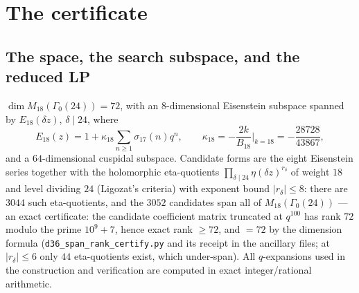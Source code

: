 \documentclass[11pt]{article}
\theoremstyle{remark}
\begin{document}
\section{The certificate}\label{sec:construction}

\subsection{The space, the search subspace, and the reduced LP}
\label{sec:space}

$\dim M_{18}(\Gamma_0(24))=72$, with an $8$-dimensional Eisenstein
subspace spanned by $E_{18}(\delta z)$, $\delta\mid 24$, where
\[
E_{18}(z)=1+\kappa_{18}\sum_{n\ge1}\sigma_{17}(n)q^n,
\qquad
\kappa_{18}=-\frac{2k}{B_{18}}\Big|_{k=18}=-\frac{28728}{43867},
\]
and a $64$-dimensional cuspidal subspace. Candidate forms are the eight
Eisenstein series together with the holomorphic eta-quotients
$\prod_{\delta\mid24}\eta(\delta z)^{r_\delta}$ of weight $18$ and
level dividing $24$ (Ligozat's criteria) with exponent bound
$|r_\delta|\le8$: there are $3044$ such eta-quotients, and the $3052$
candidates span all of $M_{18}(\Gamma_0(24))$ --- an exact certificate:
the candidate coefficient matrix truncated at $q^{100}$ has rank $72$
modulo the prime $10^9+7$, hence exact rank $\ge72$, and $=72$ by the
dimension formula (\texttt{d36\_span\_rank\_certify.py} and its receipt
in the ancillary files; at $|r_\delta|\le6$ only $44$ eta-quotients
exist, which under-span). All
$q$-expansions used in the construction and verification are computed
in exact integer/rational arithmetic.
\end{document}
